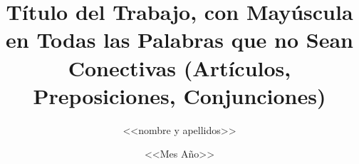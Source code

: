 
\newcommand{\Estudios}{<<estudios>>}

\newcommand{\TituloEstudios}{ <<título de los estudios>> }

\newcommand{\Departamento}{ <<departamento>> }

\newcommand{\NombreAutor}{ <<nombre y apellidos>> }

\newcommand{\NombreTutor}{ <<nombre y apellidos>> }

\newcommand{\TituloTFG}{ Título del Trabajo, con Mayúscula en Todas las Palabras que no Sean Conectivas (Artículos, Preposiciones, Conjunciones)}

\newcommand{\Fecha}{ <<Mes  Año>> }

\title{\TituloTFG}
\author{\NombreAutor}
\date{\Fecha}
